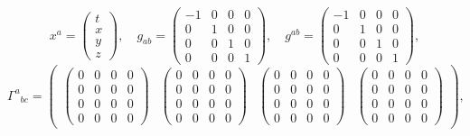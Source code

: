 \documentclass[11pt]{article}
\begin{document}
    $$x^{a}=\begin{pmatrix}t\\x\\y\\z\end{pmatrix},\quad g_{ab}=\begin{pmatrix} -1 & 0 & 0 & 0\\ 0 & 1 & 0 & 0\\ 0 & 0 & 1 & 0\\ 0 & 0 & 0 & 1 \end{pmatrix},\quad g^{ab}=\begin{pmatrix} -1 & 0 & 0 & 0\\ 0 & 1 & 0 & 0\\ 0 & 0 & 1 & 0\\ 0 & 0 & 0 & 1 \end{pmatrix},$$
$${\Gamma^{a}}_{bc}=\begin{pmatrix} \begin{pmatrix} 0 & 0 & 0 & 0\\ 0 & 0 & 0 & 0\\ 0 & 0 & 0 & 0\\ 0 & 0 & 0 & 0 \end{pmatrix} & \begin{pmatrix} 0 & 0 & 0 & 0\\ 0 & 0 & 0 & 0\\ 0 & 0 & 0 & 0\\ 0 & 0 & 0 & 0 \end{pmatrix} & \begin{pmatrix} 0 & 0 & 0 & 0\\ 0 & 0 & 0 & 0\\ 0 & 0 & 0 & 0\\ 0 & 0 & 0 & 0 \end{pmatrix} & \begin{pmatrix} 0 & 0 & 0 & 0\\ 0 & 0 & 0 & 0\\ 0 & 0 & 0 & 0\\ 0 & 0 & 0 & 0 \end{pmatrix} \end{pmatrix},$$
\end{document}
